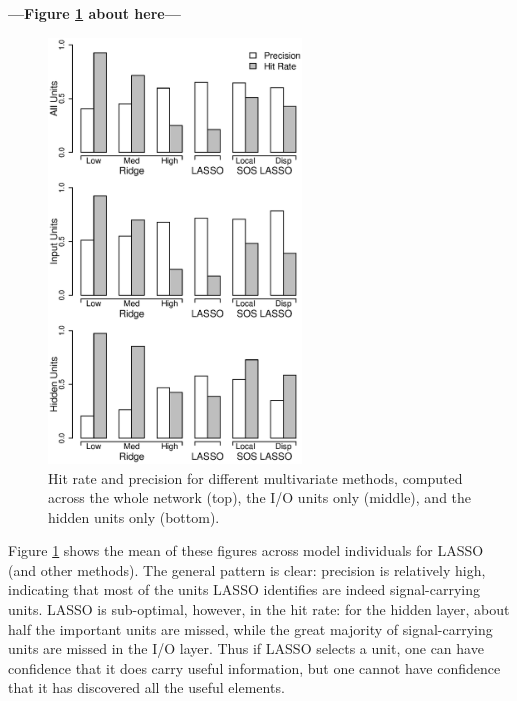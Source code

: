 \begin{center}
\textbf{---Figure \ref{fig.precision} about here---}
\end{center}

\begin{figure}
\centering
\includegraphics[width=0.6\textwidth]{figures/figure7.eps}
\caption{\label{fig.precision} Hit rate and precision for different multivariate methods, computed across the whole network (top), the I/O units only (middle), and the hidden units only (bottom).}
\end{figure}

Figure \ref{fig.precision} shows the mean of these figures across model individuals for LASSO (and other methods). The general pattern is clear: precision is relatively high, indicating that most of the units LASSO identifies are indeed signal-carrying units. LASSO is sub-optimal, however, in the hit rate: for the hidden layer, about half the important units are missed, while the great majority of signal-carrying units are missed in the I/O layer. Thus if LASSO selects a unit, one can have confidence that it does carry useful information, but one cannot have confidence that it has discovered all the useful elements.

